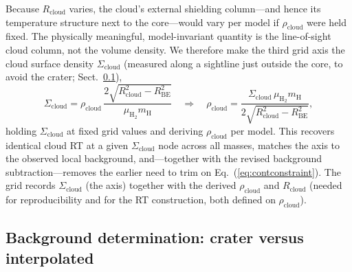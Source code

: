 \documentclass[11pt,a4paper]{article}
\newcommand{\Rbe}{R_{\mathrm{BE}}}
\newcommand{\Scloud}{\Sigma_{\mathrm{cloud}}}
\newcommand{\rhocloud}{\rho_{\mathrm{cloud}}}
\newcommand{\Rcloud}{R_{\mathrm{cloud}}}
\newcommand{\mH}{m_{\mathrm{H}}}
\begin{document}
Because $\Rcloud$ varies, the cloud's external shielding column---and hence
its temperature structure next to the core---would vary per model if
$\rhocloud$ were held fixed. The physically meaningful, model-invariant
quantity is the line-of-sight cloud column, not the volume density. We
therefore make the third grid axis the cloud surface density $\Scloud$
(measured along a sightline just outside the core, to avoid the
crater; Sect.~\ref{sec:bgdetermination}),
\begin{equation}
  \Scloud = \rhocloud\,\frac{2\sqrt{\Rcloud^{2}-\Rbe^{2}}}
                              {\mu_{\mathrm{H_2}}\mH}
  \quad\Longrightarrow\quad
  \rhocloud = \frac{\Scloud\,\mu_{\mathrm{H_2}}\mH}
                   {2\sqrt{\Rcloud^{2}-\Rbe^{2}}},
  \label{eq:sigmacloud}
\end{equation}
holding $\Scloud$ at fixed grid values and deriving $\rhocloud$ per model.
This recovers identical cloud RT at a given $\Scloud$ node across all masses,
matches the axis to the observed local background, and---together with the
revised background subtraction---removes the earlier need to trim on
Eq.~(\ref{eq:contconstraint}). The grid records $\Scloud$ (the axis) together
with the derived $\rhocloud$ and $\Rcloud$ (needed for reproducibility and for
the RT construction, both defined on $\rhocloud$).

\subsection{Background determination: crater versus interpolated}
\label{sec:bgdetermination}
\end{document}
